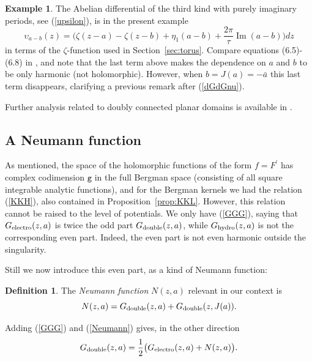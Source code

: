 \documentclass[reqno,12pt]{article}
\theoremstyle{plain}
\theoremstyle{definition}
\newtheorem{definition}{Definition}[section]
\newtheorem{example}[defn]{Example}
\numberwithin{equation}{section}
\numberwithin{figure}{section}
\DeclareMathOperator{\im}{Im}
\begin{document}
\begin{example}
The Abelian differential of the third kind with purely imaginary periods, see (\ref{upsilon}), is
in the present example
\begin{equation}\label{exupsilonab}
\upsilon_{a-b}(z)=\big(\zeta(z-a)-\zeta(z-b)+\eta_1 (a-b)+\frac{2\pi}{\tau} \im (a-b)\big)dz
\end{equation}
in terms of the $\zeta$-function used in Section~\ref{sec:torus}. 
Compare equations (6.5)-(6.8) in \cite{Gustafsson-Sebbar-2012}, and note that the last
term above makes the dependence on $a$ and $b$ to be only harmonic (not holomorphic).
However, when $b=J(a)=-\bar{a}$ this last term disappears, clarifying a previous remark after (\ref{dGdGnu}).

Further analysis related to doubly connected planar domains is available in \cite{Aboudi-2005}.
\end{example}


\subsection{A Neumann function}\label{sec:Neumann}

As mentioned, the space of the holomorphic functions of the form $f=F^\prime$ has complex  codimension 
$\texttt{g}$ in the full Bergman space (consisting of all square integrable analytic functions), and for the Bergman
kernels we had the relation (\ref{KKH}), also contained in Proposition~\ref{prop:KKL}. However, this relation cannot 
be raised to the level of potentials. We only have 
(\ref{GGG}), saying that $G_{\rm electro}(z,a)$ is twice the odd part $G_{\rm double}(z,a)$, while $G_{\rm hydro}(z,a)$
is not the corresponding even part. Indeed, the even part is not even harmonic outside the singularity.

Still we now introduce this even part, as a kind of Neumann function: 
\begin{definition}
The {\it Neumann function} $N(z,a)$ relevant in our context is
\begin{equation}\label{Neumann}
N(z,a)=G_{\rm double}(z,a)+G_{\rm double}(z,J(a)). 
\end{equation}
\end{definition}

Adding (\ref{GGG}) and (\ref{Neumann})  gives, in the other direction
\begin{equation}\label{GGN}
G_{\rm double}(z,a)=\frac{1}{2}\big(G_{\rm electro}(z,a)+N(z,a)\big).
\end{equation}
\end{document}
